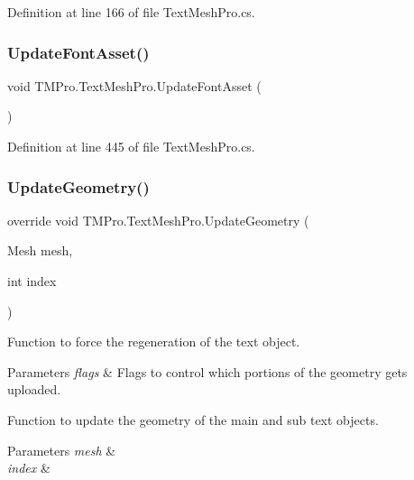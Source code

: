 Definition at line 166 of file Text\+Mesh\+Pro.\+cs.

\mbox{\label{class_t_m_pro_1_1_text_mesh_pro_abd4d7b6017050265bade2ed033d6d781}} 
\subsubsection{\texorpdfstring{UpdateFontAsset()}{UpdateFontAsset()}}
{\footnotesize\ttfamily void T\+M\+Pro.\+Text\+Mesh\+Pro.\+Update\+Font\+Asset (\begin{DoxyParamCaption}{ }\end{DoxyParamCaption})}



Definition at line 445 of file Text\+Mesh\+Pro.\+cs.

\mbox{\label{class_t_m_pro_1_1_text_mesh_pro_a6be3d7406c8db74a978505697704df07}} 
\subsubsection{\texorpdfstring{UpdateGeometry()}{UpdateGeometry()}}
{\footnotesize\ttfamily override void T\+M\+Pro.\+Text\+Mesh\+Pro.\+Update\+Geometry (\begin{DoxyParamCaption}\item[{Mesh}]{mesh,  }\item[{int}]{index }\end{DoxyParamCaption})\hspace{0.3cm}{\ttfamily [virtual]}}



Function to force the regeneration of the text object. 


\begin{DoxyParams}{Parameters}
{\em flags} & Flags to control which portions of the geometry gets uploaded.\\
\hline
\end{DoxyParams}


Function to update the geometry of the main and sub text objects. 


\begin{DoxyParams}{Parameters}
{\em mesh} & \\
\hline
{\em index} & \\
\hline
\end{DoxyParams}



